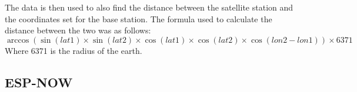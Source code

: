 \noindent
The data is then used to also find the distance between the satellite station and the coordinates set for the base station. The formula used to calculate the distance between the two was as follows:
\begin{equation}\label{eq:distance}
	\arccos(\sin(lat1)\times\sin(lat2)\times\cos(lat1)\times\cos(lat2)\times\cos(lon2-lon1)) \times 6371
\end{equation}
Where 6371 is the radius of the earth.

\subsection{ESP-NOW}



